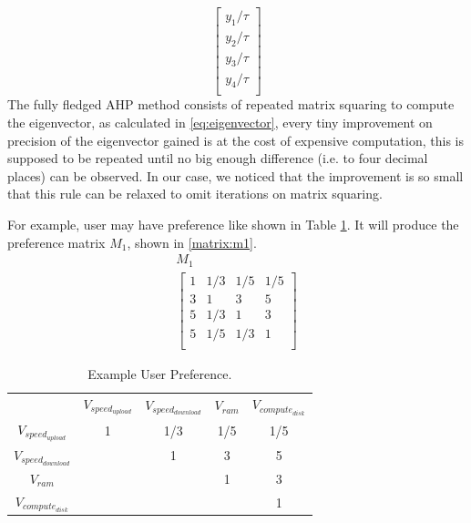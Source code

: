 \begin{equation}\label{eq:eigenvector}
\left[ \begin{array}{l}
{y_1}/\tau \\
{y_2}/\tau \\
{y_3}/\tau \\
{y_4}/\tau \\
\end{array} \right]
\end{equation}
The fully fledged AHP method consists of repeated matrix squaring to compute the eigenvector, as calculated in \eqref{eq:eigenvector}, every tiny improvement on precision of the eigenvector gained is at the cost of expensive computation, this is supposed to be repeated until no big enough difference (i.e. to four decimal places)  can be observed. In our case, we noticed that the improvement is so small that this rule can be relaxed to omit iterations on matrix squaring.

For example, user may have preference like shown in Table \ref{table:weight_example}. It will produce the preference matrix $M_1$, shown in \eqref{matrix:m1}.
\begin{equation}\label{matrix:m1}
\begin{array}{c}
    M_1\\
    \begin{bmatrix}
        1 & 1/3 & 1/5 & 1/5 \\
        3 & 1   & 3   & 5 \\
        5 & 1/3 & 1   & 3 \\
        5 & 1/5 & 1/3 & 1\\
    \end{bmatrix}
\end{array}
\end{equation}

\begin{table}
\begin{center}
\caption{Example User Preference.}
\label{table:weight_example}
\begin{tabular}{@{}c@{}c@{}c@{}c@{}c@{}}
& $V_{speed_{upload}}$ & $V_{speed_{download}}$ & $V_{ram}$ & $V_{compute_{disk}}$ \\
$V_{speed_{upload}}$ & 1 & 1/3 & 1/5 & 1/5 \\
$V_{speed_{download}}$ & & 1 & 3 & 5 \\
$V_{ram}$ & & & 1 & 3 \\
$V_{compute_{disk}}$ & & & & 1 \\
\end{tabular}
\end{center}
\end{table}


